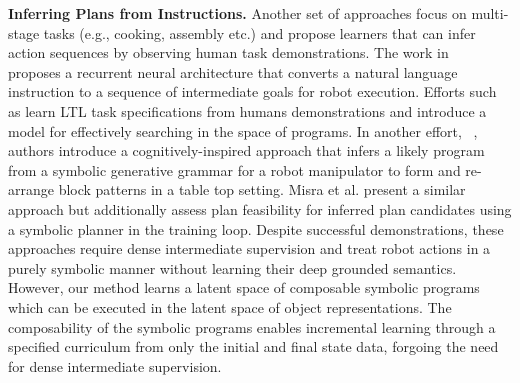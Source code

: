 \textbf{Inferring Plans from Instructions.} Another set of approaches focus on multi-stage tasks (e.g., cooking, assembly etc.) and propose 
learners that can infer action sequences by observing human task demonstrations. 
%
The work in ~\cite{paxton2019prospection} proposes a recurrent neural architecture that converts a natural language instruction to a sequence of intermediate goals for robot execution. 
%
Efforts such as \cite{shah2018bayesian,wang2020learning,kress2008translating} learn LTL task specifications from humans demonstrations and introduce a model for effectively searching in the space of programs. 
%
In another effort, ~\cite{lazaro2019beyond}, authors introduce a cognitively-inspired approach that infers 
a likely program from a symbolic generative grammar for a robot manipulator to form and re-arrange block patterns
in a table top setting. 
%
%
Misra et al. \cite{misra2016tell} present a similar approach but additionally assess plan feasibility for inferred plan candidates 
using a symbolic planner in the training loop. 
%
Despite successful demonstrations, these approaches require dense  
intermediate supervision and treat robot actions in a purely symbolic manner without learning their deep grounded semantics. 
%
However, our method learns a latent space of composable symbolic programs which can be executed in the latent space of object representations. The composability of the  symbolic programs enables incremental learning through a specified curriculum from only the initial and final state data, forgoing the need for dense intermediate supervision. 


